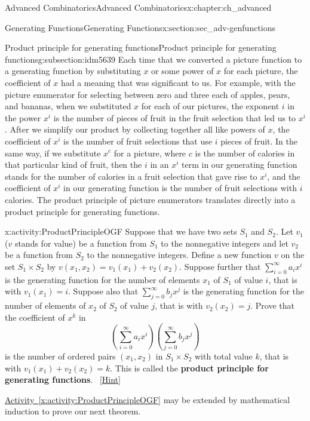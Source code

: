 \documentclass[oneside,10pt,]{book}
\newcommand{\terminology}[1]{\textbf{#1}}
\numberwithin{equation}{chapter}
\begin{document}
\begin{chapterptx}{Advanced Combinatorics}{}{Advanced Combinatorics}{}{}{x:chapter:ch_advanced}
\begin{sectionptx}{Generating Functions}{}{Generating Functions}{}{}{x:section:sec_adv-genfunctions}
\begin{subsectionptx}{Product principle for generating functions}{}{Product principle for generating functions}{}{}{g:subsection:idm5639}
Each time that we converted a picture function to a generating function by substituting \(x\) or some power of \(x\) for each picture, the coefficient of \(x\) had a meaning that was significant to us. For example, with the picture enumerator for selecting between zero and three each of apples, pears, and bananas, when we substituted \(x\) for each of our pictures, the exponent \(i\) in the power \(x^i\) is the number of pieces of fruit in the fruit selection that led us to \(x^i\). After we simplify our product by collecting together all like powers of \(x\), the coefficient of \(x^i\) is the number of fruit selections that use \(i\) pieces of fruit. In the same way, if we substitute \(x^c\) for a picture, where \(c\) is the number of calories in that particular kind of fruit, then the \(i\) in an \(x^i\) term in our generating function stands for the number of calories in a fruit selection that gave rise to \(x^i\), and the coefficient of \(x^i\) in our generating function is the number of fruit selections with \(i\) calories.  The product principle of picture enumerators translates directly into a product principle for generating functions.%
\begin{activity}{}{x:activity:ProductPrincipleOGF}%
Suppose that we have two sets \(S_1\) and \(S_2\). Let \(v_1\) (\(v\) stands for value) be a function from \(S_1\) to the nonnegative integers and let \(v_2\) be a function from \(S_2\) to the nonnegative integers.  Define a new function \(v\) on the set \(S_1 \times S_2\) by \(v(x_1,x_2) = v_1(x_1) +v_2(x_2)\). Suppose further that \(\sum_{i=0}^\infty a_ix^i\) is the generating function for the number of elements \(x_1\) of \(S_1\) of value \(i\), that is with \(v_1(x_1)=i\). Suppose also that \(\sum_{j=0}^\infty b_j x^j\) is the generating function for the number of elements of \(x_2\) of \(S_2\) of value \(j\), that is with \(v_2(x_2) = j\).  Prove that the coefficient of \(x^k\) in%
\begin{equation*}
\left(\sum_{i=0}^\infty a_ix^i\right)\left(\sum_{j=0}^\infty
b_jx^j\right)
\end{equation*}
is the number of ordered pairs \((x_1,x_2)\) in \(S_1\times S_2\) with total value \(k\), that is with \(v_1(x_1) +v_2(x_2) =k\). This is called the \terminology{product principle for generating functions}.%
\qquad~\hfill{\tiny\hyperlink{g:hint:idm5694-back}{[Hint]}}\end{activity}
\hyperref[x:activity:ProductPrincipleOGF]{Activity~\ref{x:activity:ProductPrincipleOGF}} may be extended by mathematical induction to prove our next theorem.%

\end{subsectionptx}
\end{sectionptx}
\end{chapterptx}
\end{document}
